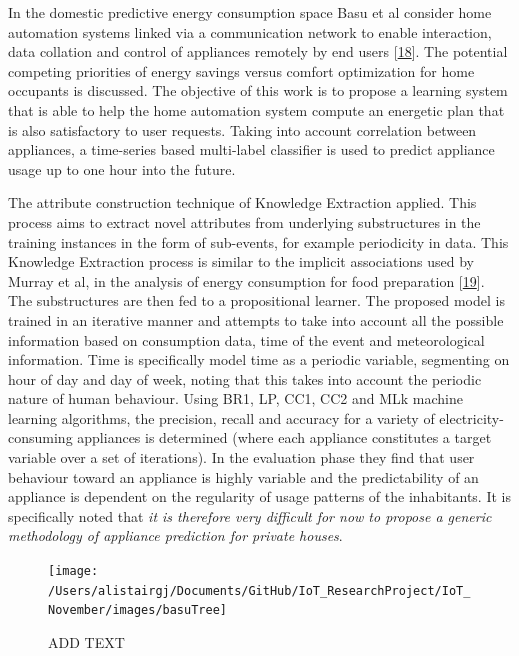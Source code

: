 \documentclass[11pt,]{article}
\begin{document}
In the domestic predictive energy consumption space Basu et al consider
home automation systems linked via a communication network to enable
interaction, data collation and control of appliances remotely by end
users
{[}\protect\hyperlink{ref-kaustavbasuApplianceUsagePrediction2012}{18}{]}.
The potential competing priorities of energy savings versus comfort
optimization for home occupants is discussed. The objective of this work
is to propose a learning system that is able to help the home automation
system compute an energetic plan that is also satisfactory to user
requests. Taking into account correlation between appliances, a
time-series based multi-label classifier is used to predict appliance
usage up to one hour into the future.

The attribute construction technique of Knowledge Extraction applied.
This process aims to extract novel attributes from underlying
substructures in the training instances in the form of sub-events, for
example periodicity in data. This Knowledge Extraction process is
similar to the implicit associations used by Murray et al, in the
analysis of energy consumption for food preparation
{[}\protect\hyperlink{ref-d.m.murrayApplianceElectricalConsumption2018}{19}{]}.
The substructures are then fed to a propositional learner. The proposed
model is trained in an iterative manner and attempts to take into
account all the possible information based on consumption data, time of
the event and meteorological information. Time is specifically model
time as a periodic variable, segmenting on hour of day and day of week,
noting that this takes into account the periodic nature of human
behaviour. Using BR1, LP, CC1, CC2 and MLk machine learning algorithms,
the precision, recall and accuracy for a variety of
electricity-consuming appliances is determined (where each appliance
constitutes a target variable over a set of iterations). In the
evaluation phase they find that user behaviour toward an appliance is
highly variable and the predictability of an appliance is dependent on
the regularity of usage patterns of the inhabitants. It is specifically
noted that \emph{it is therefore very difficult for now to propose a
generic methodology of appliance prediction for private houses}.

\begin{figure}[H]

{\centering \texttt{[image: /Users/alistairgj/Documents/GitHub/IoT\_ResearchProject/IoT\_November/images/basuTree]} 

}

\caption{ADD TEXT}\label{fig:unnamed-chunk-5}
\end{figure}
\end{document}
